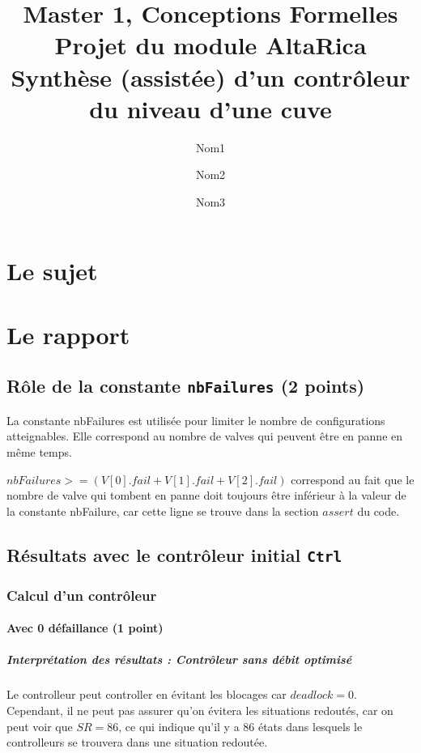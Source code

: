 \documentclass[a4paper]{book}
\newcommand{\altarica}{{\sc AltaRica}}
\begin{document}
\title{Master 1, Conceptions Formelles\\
Projet du module \altarica\\
Synthèse (assistée) d'un contrôleur du niveau d'une cuve}

\date{}

\author{Nom1 \and Nom2 \and Nom3}

\maketitle

\chapter{Le sujet}


\chapter{Le rapport}
\section{Rôle de la constante {\tt nbFailures} (2 points)}
La constante nbFailures est utilisée pour limiter le nombre de configurations atteignables. Elle correspond au nombre de valves qui peuvent être en panne en même temps.

$nbFailures >= (V[0].fail + V[1].fail + V[2].fail)$ correspond au fait que le nombre de valve qui tombent en panne doit toujours être inférieur à la valeur de la constante nbFailure, car cette ligne se trouve dans la section $assert$ du code.

\section{Résultats avec le contrôleur initial {\tt Ctrl}}
\subsection{Calcul d'un contrôleur}
\subsubsection{Avec 0 défaillance (1 point)}


%
%
%
\paragraph{Interprétation des résultats : Contrôleur sans débit optimisé}
Le controlleur peut controller en évitant les blocages car $deadlock = 0$. Cependant, il ne peut pas assurer qu'on évitera les situations redoutés,
car on peut voir que $SR = 86$, ce qui indique qu'il y a 86 états dans lesquels le controlleurs se trouvera dans une situation redoutée.
\end{document}
